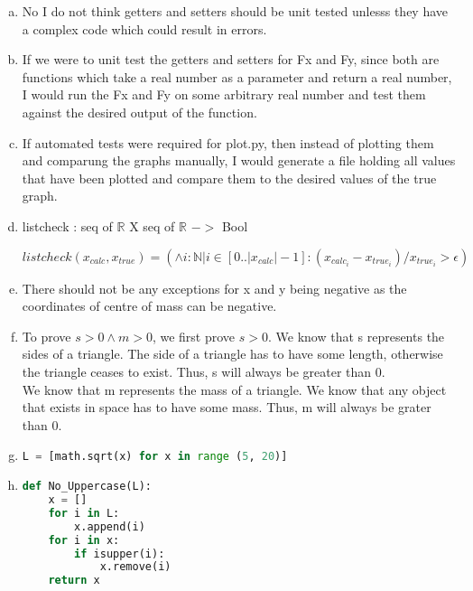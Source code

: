\documentclass[12pt]{article}
\begin{document}
\begin{enumerate}[a)]

\item No I do not think getters and setters should be unit tested unlesss they have a complex code which could result in errors.

\item If we were to unit test the getters and setters for Fx and Fy, since both are functions which take a real number as a parameter and return a real number, I would run the Fx and Fy on some arbitrary real number and test them against the desired output of the function.

\item If automated tests were required for plot.py, then instead of plotting them and comparung the graphs manually, I would generate a file holding all values that have been plotted and compare them to the desired values of the true graph.

\item listcheck : seq of $\mathbb{R}$ X seq of $\mathbb{R}$ $->$ Bool

\noindent $listcheck(x_{calc}, x_{true}) = (\land i : \mathbb{N}|i \in [0..|x_{calc}|-1] : (x_{calc}_i- x_{true}_i)/x_{true}_i > \epsilon)$

\item There should not be any exceptions for x and y being negative as the coordinates of centre of mass can be negative.

\item To prove $s > 0 \land m > 0$, we first prove $s > 0$. We know that s represents the sides of a triangle. The side of a triangle has to have some length, otherwise the triangle ceases to exist. Thus, s will always be greater than 0.\\

\noindent We know that m represents the mass of a triangle. We know that any object that exists in space has to have some mass. Thus, m will always be grater than 0.

\item \begin{lstlisting}[language=Python]
L = [math.sqrt(x) for x in range (5, 20)]
\end{lstlisting}

\item \begin{lstlisting}[language=Python]
def No_Uppercase(L):
    x = []
    for i in L:
        x.append(i)
    for i in x:
        if isupper(i):
            x.remove(i)
    return x
\end{lstlisting}


\end{enumerate}
\end{document}
